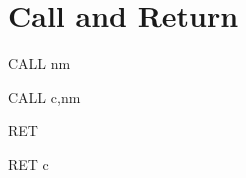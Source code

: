 \section{Call and Return}

\vspace*{0.7ex} %
\begin{minipage}{\textwidth}
	
\begin{instrtable}

	\begin{instruction}{CALL nm} 
			\FlagsCALLnn
		\SkipToSymbol
			\FromSymbolToOpCode
		\SkipToSymbol
			\FromSymbolToOpCode
		\SkipToSymbol
	\end{instruction}

	\begin{instruction}{CALL c,nm} 
			\FlagsCALLccnn
		\SkipToOpCode
		\SkipToOpCode
	\end{instruction}

	\begin{instruction}{RET} 
		\Symbol{\SymRET[0]}
			\FlagsRET
		\SkipToSymbol
			\Symbol{\SymRET[1]}
		\SkipToSymbol
			\Symbol{\SymRET[2]}
	\end{instruction}

	\begin{instruction}{RET c} 
			\FlagsRETcc
		\SkipToOpCode
			\OpCode{}{}{}
			\Hex{}{}
	\end{instruction}


\end{instrtable}
\end{minipage}

